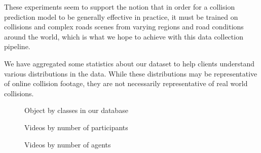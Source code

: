 \documentclass[letterpaper, 10 pt, conference]{IEEEconf}
\begin{document}
These experiments seem to support the notion that in order for a collision prediction model to be generally effective in practice, it must be trained on collisions and complex roads scenes from varying regions and road conditions around the world, which is what we hope to achieve with this data collection pipeline.






\byclass
{}\byactors
{}\byagents
{}\byduration

We have aggregated some statistics about our dataset to help clients understand various distributions in the data. While these distributions may be representative of online collision footage, they are not necessarily representative of real world collisions. 

\begin{figure}[htpb]
		\centering
		\caption{Object by classes in our database}
		\label{fig:obj-by-class}
\end{figure}

\begin{figure}[htpb]
		\centering
		\caption{Videos by number of participants}
		\label{fig:vids-by-participant}
\end{figure}

\begin{figure}[htpb]
		\centering
		\caption{Videos by number of agents}
		\label{fig:vids-by-agents}
\end{figure}
\end{document}
